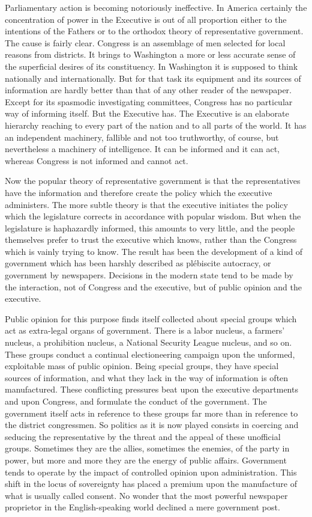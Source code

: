 \documentclass[openany,nobib,nohyper]{tufte-book}
\begin{document}
Parliamentary action is becoming notoriously ineffective. In America
certainly the concentration of power in the Executive is out of all
proportion either to the intentions of the Fathers or to the orthodox
theory of representative government. The cause is fairly clear. Congress
is an assemblage of men selected for local reasons from districts. It
brings to Washington a more or less accurate sense of the superficial
desires of its constituency. In Washington it is supposed to think
nationally and internationally. But for that task its equipment and its
sources of information are hardly better than that of any other reader
of the newspaper. Except for its spasmodic investigating committees,
Congress has no particular way of informing itself. But the Executive
has. The Executive is an elaborate hierarchy reaching to every part of
the nation and to all parts of the world. It has an independent
machinery, fallible and not too truthworthy, of course, but nevertheless
a machinery of intelligence. It can be informed and it can act, whereas
Congress is not informed and cannot act.

Now the popular theory of representative government is that the
representatives have the information and therefore create the policy
which the executive administers. The more subtle theory is that the
executive initiates the policy which the legislature corrects in
accordance with popular wisdom. But when the legislature is haphazardly
informed, this amounts to very little, and the people themselves prefer
to trust the executive which knows, rather than the Congress which is
vainly trying to know. The result has been the development of a kind of
government which has been harshly described as plébiscite autocracy, or
government by newspapers. Decisions in the modern state tend to be made
by the interaction, not of Congress and the executive, but of public
opinion and the executive.

Public opinion for this purpose finds itself collected about special
groups which act as extra-legal organs of government. There is a labor
nucleus, a farmers' nucleus, a prohibition nucleus, a National Security
League nucleus, and so on. These groups conduct a continual
electioneering campaign upon the unformed, exploitable mass of public
opinion. Being special groups, they have special sources of information,
and what they lack in the way of information is often manufactured.
These conflicting pressures beat upon the executive departments and upon
Congress, and formulate the conduct of the government. The government
itself acts in reference to these groups far more than in reference to
the district congressmen. So politics as it is now played consists in
coercing and seducing the representative by the threat and the appeal of
these unofficial groups. Sometimes they are the allies, sometimes the
enemies, of the party in power, but more and more they are the energy of
public affairs. Government tends to operate by the impact of controlled
opinion upon administration. This shift in the locus of sovereignty has
placed a premium upon the manufacture of what is usually called consent.
No wonder that the most powerful newspaper proprietor in the
English-speaking world declined a mere government post.
\end{document}
